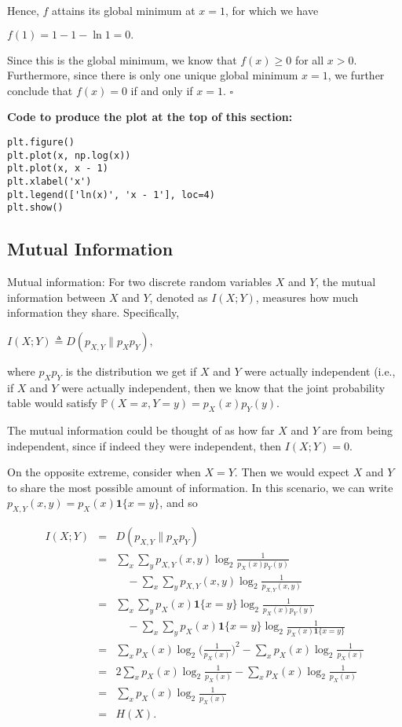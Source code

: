 \documentclass[6008notes.tex]{subfiles}
\begin{document}
Hence, $f$ attains its global minimum at $x=1$, for which we have

{\centering$f(1)=1-1-\ln 1=0.$ \par}

Since this is the global minimum, we know that $f(x) \ge 0$ for all $x>0$. Furthermore, since there is only one unique global minimum $x=1$, we further conclude that $f(x)=0$ if and only if $x=1$. $\square$

\textbf{Code to produce the plot at the top of this section:}

\begin{lstlisting}
plt.figure()
plt.plot(x, np.log(x))
plt.plot(x, x - 1)
plt.xlabel('x')
plt.legend(['ln(x)', 'x - 1'], loc=4)
plt.show()
\end{lstlisting}

\subsection{Mutual Information}

Mutual information: For two discrete random variables $X$ and $Y$, the mutual information between $X$ and $Y$, denoted as $I(X;Y)$, measures how much information they share. Specifically,

{\centering$I(X;Y)\triangleq D(p_{X,Y}\parallel p_{X}p_{Y}),$ \par}
 
where $p_Xp_Y$ is the distribution we get if $X$ and $Y$ were actually independent (i.e., if $X$ and $Y$ were actually independent, then we know that the joint probability table would satisfy $\mathbb {P}(X=x,Y=y)=p_{X}(x)p_{Y}(y)$.

The mutual information could be thought of as how far $X$ and $Y$ are from being independent, since if indeed they were independent, then $I(X;Y)=0$.

On the opposite extreme, consider when $X=Y$. Then we would expect $X$ and $Y$ to share the most possible amount of information. In this scenario, we can write $p_{X,Y}(x,y)=p_{X}(x)\mathbf{1}\{ x=y\}$, and so

\begin{eqnarray*}
I(X;Y)
&=&D(p_{X,Y}\parallel p_{X}p_{Y})\\
&=&\sum_{x}\sum_{y}p_{X,Y}(x,y)\log_{2}\frac{1}{p_{X}(x)p_{Y}(y)}\\
&&\quad
  -\sum_{x}\sum_{y}p_{X,Y}(x,y)\log_{2}\frac{1}{p_{X,Y}(x,y)}\\
&=&\sum_{x}\sum_{y}p_{X}(x)\mathbf{1}\{x=y\}\log_{2}\frac{1}{p_{X}(x)p_{Y}(y)}\\
&&\quad
  -\sum_{x}\sum_{y}p_{X}(x)\mathbf{1}\{x=y\}\log_{2}\frac{1}{p_{X}(x)\mathbf{1}\{x=y\}}\\
&=&\sum_{x}p_{X}(x)\log_{2}\Big(\frac{1}{p_{X}(x)}\Big)^{2}-\sum_{x}p_{X}(x)\log_{2}\frac{1}{p_{X}(x)}\\
&=&2\sum_{x}p_{X}(x)\log_{2}\frac{1}{p_{X}(x)}-\sum_{x}p_{X}(x)\log_{2}\frac{1}{p_{X}(x)}\\
&=&\sum_{x}p_{X}(x)\log_{2}\frac{1}{p_{X}(x)}\\
&=&H(X).
\end{eqnarray*}
\end{document}
